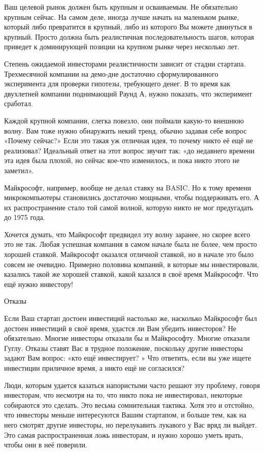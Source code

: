 \documentclass[ebook,12pt,oneside,openany]{memoir}
\begin{document}
Ваш целевой рынок должен быть крупным и осваиваемым. Не обязательно
крупным сейчас. На самом деле, иногда лучше начать на маленьком рынке,
который либо превратится в крупный, либо из которого Вы можете
двинуться в крупный. Просто должна быть реалистичная
последовательность шагов, которая приведет к доминирующей позиции на
крупном рынке через несколько лет.

Степень ожидаемой инвесторами реалистичности зависит от стадии
стартапа. Трехмесячной компании на демо-дне достаточно
сформулированного эксперимента для проверки гипотезы, требующего
денег. В то время как двухлетней компании поднимающий Раунд А, нужно
показать, что эксперимент сработал.

Каждой крупной компании, слегка повезло, они поймали какую-то внешнюю
волну. Вам тоже нужно обнаружить некий тренд, обычно задавая себе
вопрос «Почему сейчас?» Если это такая уж отличная идея, то почему
никто её ещё не реализовал? Идеальный ответ на этот вопрос звучит так:
«до недавнего времени эта идея была плохой, но сейчас кое-что
изменилось, и пока никто этого не заметил».

Майкрософт, например, вообще не делал ставку на BASIC. Но к тому
времени микрокомпьютеры становились достаточно мощными, чтобы
поддерживать его. А их распространение стало той самой волной, которую
никто не мог предугадать до 1975 года.

Хочется думать, что Майкрософт предвидел эту волну заранее, но скорее
всего это не так. Любая успешная компания в самом начале была не
более, чем просто хорошей ставкой. Майкрософт оказался отличной
ставкой, но в начале это было совсем не очевидно. Примерно половина
компаний, в которые мы инвестировали, казались такой же хорошей
ставкой, какой казался в своё время Майкрософт. Что ещё нужно
инвестору!

Отказы

Если Ваш стартап достоен инвестиций настолько же, насколько Майкрософт
был достоен инвестиций в своё время, удастся ли Вам убедить
инвесторов? Не обязательно. Многие инвесторы отказали бы и
Майкрософту. Многие отказали Гуглу. Отказы ставят Вас в трудное
положение, поскольку другие инвесторы задают Вам вопрос: «кто ещё
инвестирует? » Что ответить, если вы уже ищете инвестиции приличное
время, а никто ещё не согласился?

Люди, которым удается казаться напористыми часто решают эту проблему,
говоря инвесторам, что несмотря на то, что никто пока не инвестировал,
некоторые собираются это сделать. Это весьма сомнительная тактика.
Хотя это и отстойно, что инвесторы меньше интересуются Вашим
стартапом, и больше тем, как на него смотрят другие инвесторы, но
перелукавить лукавого у Вас вряд ли выйдет. Это самая распространенная
ложь инвесторам, и нужно хорошо уметь врать, чтобы они в неё поверили.
\end{document}
